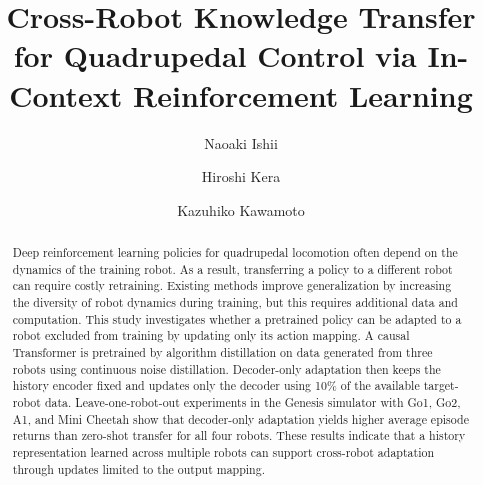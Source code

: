 \documentclass[runningheads]{llncs}
\begin{document}
%
\title{Cross-Robot Knowledge Transfer for Quadrupedal Control via In-Context Reinforcement Learning}
%
%

\author{Naoaki Ishii%
\and
Hiroshi Kera%
\and
Kazuhiko Kawamoto%
}

%
%




%
\maketitle              %
%
\begin{abstract}
Deep reinforcement learning policies for quadrupedal locomotion often depend on the dynamics of the training robot. 
As a result, transferring a policy to a different robot can require costly retraining.
Existing methods improve generalization by increasing the diversity of robot dynamics during training, but this requires additional data and computation.
This study investigates whether a pretrained policy can be adapted to a robot excluded from training by updating only its action mapping.
A causal Transformer is pretrained by algorithm distillation on data generated from three robots using continuous noise distillation.
Decoder-only adaptation then keeps the history encoder fixed and updates only the decoder using 10\% of the available target-robot data.
Leave-one-robot-out experiments in the Genesis simulator with Go1, Go2, A1, and Mini Cheetah show that decoder-only adaptation yields higher average episode returns than zero-shot transfer for all four robots.
These results indicate that a history representation learned across multiple robots can support cross-robot adaptation through updates limited to the output mapping.


\end{abstract}
\end{document}
